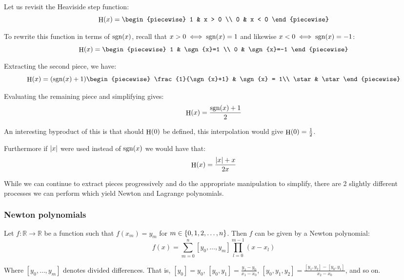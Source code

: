 \begin{example}
    \label{example:heaviside_further}
    Let us revisit the Heaviside step function:
    $$
        \step{x} = \begin{piecewise}
            1 & x > 0 \\
            0 & x < 0
        \end{piecewise}
    $$

    To rewrite this function in terms of $\sgn{x}$, recall that $x>0\iff \sgn{x}=1$ and likewise $x<0\iff \sgn{x}=-1$:
    $$
        \step{x} = \begin{piecewise}
            1 & \sgn{x}=1 \\
            0 & \sgn{x}=-1
        \end{piecewise}
    $$

    Extracting the second piece, we have:
    $$
        \step{x} = (\sgn{x}+1)\begin{piecewise}
            \frac{1}{\sgn{x}+1} & \sgn{x} = 1\\
            \star & \star
        \end{piecewise}
    $$

    Evaluating the remaining piece and simplifying gives:
    $$
        \step{x} = \frac{\sgn{x}+1}{2}
    $$

    An interesting byproduct of this is that should $\step{0}$ be defined, this interpolation would give $\step{0}=\frac{1}{2}$.

    Furthermore if $\abs{x}$ were used instead of $\sgn{x}$ we would have that:
    $$
        \step{x} = \frac{\abs{x}+x}{2x}
    $$
\end{example}

While we can continue to extract pieces progressively and do the appropriate manipulation to simplify, there are 2 slightly different processes we can perform which yield Newton and Lagrange polynomials.

\subsubsection{Newton polynomials}
Let $f:\mathbb{R}\to\mathbb{R}$ be a function such that $f(x_m)=y_m$ for $m\in\{0,1,2,\dots,n\}$. Then $f$ can be given by a Newton polynomial:
$$
    f(x) = \sum_{m=0}^{n}{[y_0,\dots,y_m]\prod_{l=0}^{m-1}{(x-x_l)}}
$$

Where $[y_0,\dots,y_m]$ denotes divided differences. That is, $[y_0]=y_0$, $[y_0,y_1]=\frac{y_1-y_0}{x_1-x_0}$, $[y_0,y_1,y_2]=\frac{[y_1,y_2]-[y_0,y_1]}{x_2-x_0}$, and so on.

